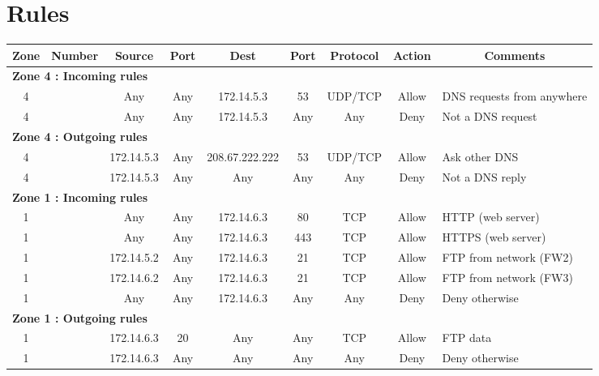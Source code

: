 \documentclass[a4paper,titlepage]{article}
\begin{document}
\section{Rules}
\label{sec:Rules}

\begin{landscape}
	\vspace*{\fill}
	\begin{table}[h]
		\center
		\begin{tabular}{c|c|cc|cc|ccl}
			Zone & Number & Source & Port & Dest & Port & Protocol & Action & \multicolumn{1}{c}{Comments}\\

			\hline
			\multicolumn{9}{l}{\textbf{Zone 4 : Incoming rules}}\\
			4 &  & Any & Any & 172.14.5.3 & 53 & UDP/TCP & Allow & DNS requests from anywhere\\
			4 &  & Any & Any & 172.14.5.3 & Any & Any & Deny & Not a DNS request\\

			\hline
			\multicolumn{9}{l}{\textbf{Zone 4 : Outgoing rules}}\\
			4 &  & 172.14.5.3 & Any & 208.67.222.222 & 53 & UDP/TCP & Allow & Ask other DNS\\
			4 &  & 172.14.5.3 & Any & Any & Any & Any & Deny & Not a DNS reply\\

			\hline
			\multicolumn{9}{l}{\textbf{Zone 1 : Incoming rules}}\\
			1 &  & Any & Any & 172.14.6.3 & 80 & TCP & Allow & HTTP (web server)\\
			1 &  & Any & Any & 172.14.6.3 & 443 & TCP & Allow & HTTPS (web server)\\
			1 &  & 172.14.5.2 & Any & 172.14.6.3 & 21 & TCP & Allow & FTP from network (FW2)\\
			1 &  & 172.14.6.2 & Any & 172.14.6.3 & 21 & TCP & Allow & FTP from network (FW3)\\
			1 &  & Any & Any & 172.14.6.3 & Any & Any & Deny & Deny otherwise\\

			\hline
			\multicolumn{9}{l}{\textbf{Zone 1 : Outgoing rules}}\\
			1 &  & 172.14.6.3 & 20 & Any & Any & TCP & Allow & FTP data\\
			1 &  & 172.14.6.3 & Any & Any & Any & Any & Deny & Deny otherwise\\


\end{tabular}
\end{table}
\end{landscape}
\end{document}

